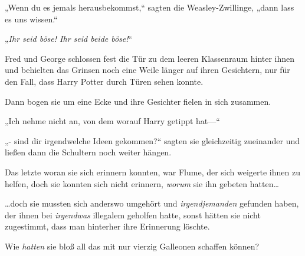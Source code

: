 „Wenn du es jemals herausbekommst,“ sagten die Weasley-Zwillinge, „dann lass es uns wissen.“

„\emph{Ihr seid böse! Ihr seid beide böse!}“

Fred und George schlossen fest die Tür zu dem leeren Klassenraum hinter ihnen und behielten das Grinsen noch eine Weile länger auf ihren Gesichtern, nur für den Fall, dass Harry Potter durch Türen sehen konnte.

Dann bogen sie um eine Ecke und ihre Gesichter fielen in sich zusammen.

„Ich nehme nicht an, von dem worauf Harry getippt hat—“

„- sind dir irgendwelche Ideen gekommen?“ sagten sie gleichzeitig zueinander und ließen dann die Schultern noch weiter hängen.

Das letzte woran sie sich erinnern konnten, war Flume, der sich weigerte ihnen zu helfen, doch sie konnten sich nicht erinnern, \emph{worum} sie ihn gebeten hatten…

…doch sie mussten sich anderswo umgehört und \emph{irgendjemanden} gefunden haben, der ihnen bei \emph{irgendwas} illegalem geholfen hatte, sonst hätten sie nicht zugestimmt, dass man hinterher ihre Erinnerung löschte.

Wie \emph{hatten} sie bloß all das mit nur vierzig Galleonen schaffen können?

